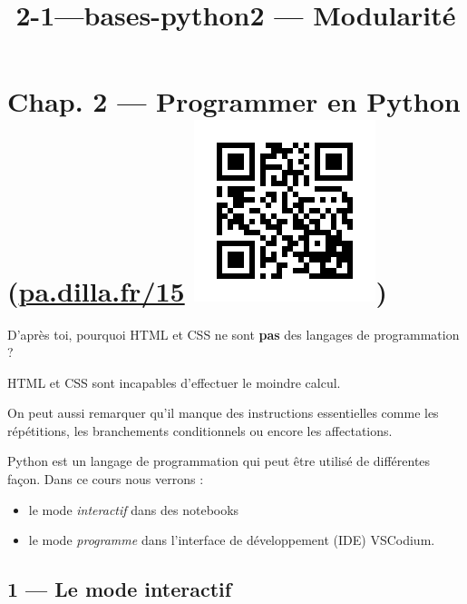\documentclass[a4paper,17pt]{extarticle}
\title{2-1---bases-python}
\providecommand{\tightlist}{%
      \setlength{\itemsep}{0pt}\setlength{\parskip}{0pt}}
\begin{document}
    
    \title{2 --- Modularité}

    
    

    
    \hypertarget{chap.-2-programmer-en-python-pa.dilla.fr15}{%
\section[Chap. 2 --- Programmer en Python
(\href{https://pa.dilla.fr/15}{pa.dilla.fr/15} )]{\texorpdfstring{Chap.
2 --- Programmer en Python
(\href{https://pa.dilla.fr/15}{pa.dilla.fr/15}
\protect\includegraphics{res/qr-basthon.png})}{Chap. 2 --- Programmer en Python (pa.dilla.fr/15 )}}\label{chap.-2-programmer-en-python-pa.dilla.fr15}}

    D'après toi, pourquoi HTML et CSS ne sont \textbf{pas} des langages de
programmation ?

    HTML et CSS sont incapables d'effectuer le moindre calcul.

On peut aussi remarquer qu'il manque des instructions essentielles comme
les répétitions, les branchements conditionnels ou encore les
affectations.

    Python est un langage de programmation qui peut être utilisé de
différentes façon. Dans ce cours nous verrons :

\begin{itemize}
\tightlist
\item
  le mode \emph{interactif} dans des notebooks
\item
  le mode \emph{programme} dans l'interface de développement (IDE)
  VSCodium.
\end{itemize}

    \hypertarget{le-mode-interactif}{%
\subsection{1 --- Le mode interactif}\label{le-mode-interactif}}
\end{document}
